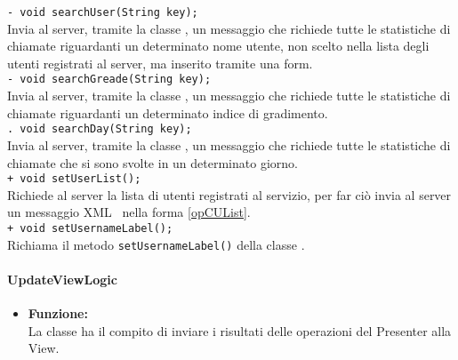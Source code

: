 {{\begin{sloppypar}
{{\begin{itemize}
{					\texttt{- void searchUser(String key);}\\
					Invia al server\g, tramite la classe , un messaggio che richiede tutte le statistiche di chiamate riguardanti un determinato nome utente, non scelto nella lista degli utenti registrati al server\g, ma inserito tramite una form.\\

					\texttt{- void searchGreade(String key);}\\
					Invia al server\g, tramite la classe , un messaggio che richiede tutte le statistiche di chiamate riguardanti un determinato indice di gradimento.\\
					
					\texttt{. void searchDay(String key);}\\
					Invia al server\g, tramite la classe , un messaggio che richiede tutte le statistiche di chiamate che si sono svolte in un determinato giorno.\\
					
					\texttt{+ void setUserList();}\\
					Richiede al server la lista di utenti registrati al servizio, per far ciò invia al server un messaggio XML\g~ nella forma \ref{opCUList}.\\
					
					\texttt{+ void setUsernameLabel();}\\
					Richiama il metodo \texttt{setUsernameLabel()} della classe .
				}
			\end{itemize}
			}


		

		\paragraph{UpdateViewLogic}\label{par:UpdateViewLogic}{
			\begin{itemize}
				\item[] \textbf{Funzione:} \\
					La classe ha il compito di inviare i risultati delle operazioni del Presenter alla View.\\
				

\end{itemize}}}
\end{sloppypar}}}
